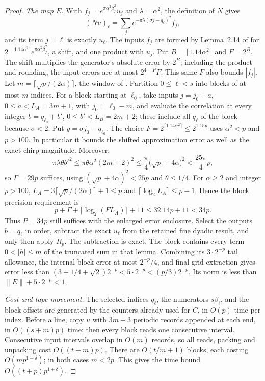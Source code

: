 \begin{proof}
\emph{The map $E$.} With $f_j=e^{\pi\alpha^2\beta_j^2}u_j$ and
$\lambda=\alpha^2$, the definition of $N$ gives
\[
 (Nu)_\ell=\sum_je^{-\pi\lambda(\sigma j-q_\ell)^2}f_j,
\]
and its term $j=\ell$ is exactly $u_\ell$. The inputs $f_j$ are formed by
Lemma~2.14 of \cite{HarveyHoeven2021} for
$2^{-\lceil1.14\alpha^2\rceil}e^{\pi\alpha^2\beta_j^2}$, a shift, and one
product with $u_j$. Put $B=\lceil1.14\alpha^2\rceil$ and $F=2^B$.
The shift multiplies the generator's absolute error by $2^B$;
including the product and rounding, the input errors are at most
$2^{4-P}F$. This same $F$ also bounds $|f_j|$. Let
$m=\lceil\sqrt p/(2\alpha)\rceil$, the window of
\cite[Lemma~4.11]{HarveyHoeven2021}. Partition $0\le\ell<s$ into blocks
of at most $m$ indices. For a block starting at $\ell_0$, take inputs
$j=j_0+a$, $0\le a<L_A=3m+1$, with $j_0=\ell_0-m$, and evaluate the
correlation at every integer $b=q_{\ell_0}+b'$, $0\le b'<L_B=2m+2$; these
include all $q_\ell$ of the block because $\sigma<2$. Put
$y=\sigma j_0-q_{\ell_0}$. The choice
$F=2^{\lceil1.14\alpha^2\rceil}\le2^{1.15p}$ uses
$\alpha^2<p$ and $p>100$. In particular it bounds the shifted
approximation error as well as the exact chirp magnitude. Moreover,
\[
 \pi\lambda\theta b'^2\le\pi\theta\alpha^2(2m+2)^2
   \le\frac\pi4\bigl(\sqrt p+4\alpha\bigr)^2<\frac{25\pi}4p,
\]
so $\Gamma=29p$ suffices, using
$(\sqrt p+4\alpha)^2<25p$ and $\theta\le1/4$.
For $\alpha\ge2$ and integer $p>100$,
$L_A=3\lceil\sqrt p/(2\alpha)\rceil+1\le p$ and
$\lceil\log_2 L_A\rceil\le p-1$. Hence the block precision requirement is
\[
 p+\Gamma+\lceil\log_2(FL_A)\rceil+11
 \le 32.14p+11<34p.
\]
Thus $P=34p$ still suffices with the enlarged error enclosure.
Select the outputs
$b=q_\ell$ in order, subtract the exact $u_\ell$ from the retained fine
dyadic result, and only then apply $R_p$. The subtraction is exact.
The block contains every term $0<|h|\le m$ of the truncated sum in that
lemma. Combining its $3\cdot2^{-p}$ tail allowance, the internal block
error at most $2^{-p}/4$, and final grid extraction gives error less than
$(3+1/4+\sqrt2)2^{-p}<5\cdot2^{-p}<(p/3)2^{-p}$.
Its norm is less than
$\|E\|+5\cdot2^{-p}<1$.

\emph{Cost and tape movement.} The selected indices $q_\ell$, the numerators
$s\beta_\ell$, and the block offsets are generated by the
counters already used for $C$, in $O(p)$ time per index. Before a line,
copy $u$ with $3m+3$ periodic records appended at each end, in $O((s+m)p)$
time; then every block reads one consecutive interval. Consecutive input
intervals overlap in $O(m)$ records, so all reads, packing and unpacking
cost $O((t+m)p)$. There are $O(t/m+1)$ blocks, each costing
$O(mp^{1+\delta})$; in both cases $m<2p$. This gives the time bound
$O((t+p)p^{1+\delta})$.
\end{proof}
